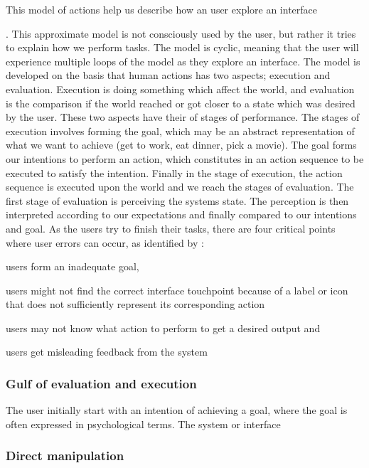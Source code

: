 This model of actions help us describe how an user explore an interface \cite{}. This approximate model \cite{Norman2013a} is not consciously used by the user, but rather it tries to explain how we perform tasks. The model is cyclic, meaning that the user will experience multiple loops of the model as they explore an interface. The model is developed on the basis that human actions has two aspects; execution and evaluation. Execution is doing something which affect the world, and evaluation is the comparison if the world reached or got closer to a state which was desired by the user. These two aspects have their of stages of performance. The stages of execution involves forming the goal, which may be an abstract representation of what we want to achieve (get to work, eat dinner, pick a movie). The goal forms our intentions to perform an action, which constitutes in an action sequence to be executed to satisfy the intention. Finally in the stage of execution, the action sequence is executed upon the world and we reach the stages of evaluation. The first stage of evaluation is perceiving the systems state. The perception is then interpreted according to our expectations and finally compared to our intentions and goal. As the users try to finish their tasks, there are four critical points where user errors can occur, as identified by \cite{Shneiderman2004}:
\begin{enumerate*}
  \item users form an inadequate goal,
  \item users might not find the correct interface touchpoint because of a label or icon that does not sufficiently represent its corresponding action
  \item users may not know what action to perform to get a desired output and
  \item users get misleading feedback from the system
\end{enumerate*}


\subsubsection{Gulf of evaluation and execution}
The user initially start with an intention of achieving a goal, where the goal is often expressed in psychological terms. The system or interface

\subsubsection{Direct manipulation}


